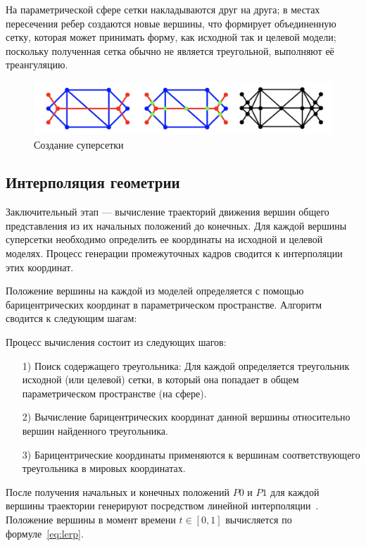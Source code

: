     На параметрической сфере сетки накладываются друг на друга; в местах пересечения ребер создаются новые вершины, что формирует объединенную сетку, которая может принимать форму, как исходной так и целевой модели; поскольку полученная сетка обычно не является треугольной, выполняют её треангуляцию.
    
   	\begin{figure}[H]
	   	\centering
	   	\includegraphics[width=\textwidth]{../inc/images/supermesh}
	   	\caption{Создание суперсетки}
	   	\label{fig:supermesh}
    \end{figure}

    \subsection{Интерполяция геометрии}
    Заключительный этап --- вычисление траекторий движения вершин общего представления из их начальных положений до конечных. Для каждой вершины суперсетки необходимо определить ее координаты на исходной и целевой моделях. Процесс генерации промежуточных кадров сводится к интерполяции этих координат.

	Положение вершины на каждой из моделей определяется с помощью барицентрических координат в параметрическом пространстве\cite{mocanu,alexa}. Алгоритм сводится к следующим шагам:
    
    Процесс вычисления состоит из следующих шагов:
    \begin{enumerate}
        \item[1)] Поиск содержащего треугольника: Для каждой определяется треугольник исходной (или целевой) сетки, в который она попадает в общем параметрическом пространстве (на сфере).
        \item[2)] Вычисление барицентрических координат данной вершины относительно вершин найденного треугольника.
        \item[3)] Барицентрические координаты применяются к вершинам соответствующего треугольника в мировых координатах.
    \end{enumerate}

	После получения начальных и конечных положений $P0$ и $P1$ для каждой вершины траектории генерируют посредством линейной интерполяции~\cite{mocanu,alexa}. Положение вершины в момент времени $t\in [0,1]$ вычисляется по формуле~\eqref{eq:lerp}.

